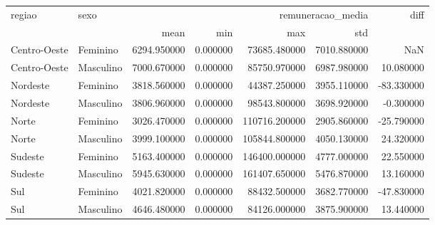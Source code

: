 \begin{tabular}{llrrrrr}
\toprule
regiao & sexo & \multicolumn{4}{r}{remuneracao_media} & diff \\
 &  & mean & min & max & std &  \\
\midrule
Centro-Oeste & Feminino & 6294.950000 & 0.000000 & 73685.480000 & 7010.880000 & NaN \\
Centro-Oeste & Masculino & 7000.670000 & 0.000000 & 85750.970000 & 6987.980000 & 10.080000 \\
Nordeste & Feminino & 3818.560000 & 0.000000 & 44387.250000 & 3955.110000 & -83.330000 \\
Nordeste & Masculino & 3806.960000 & 0.000000 & 98543.800000 & 3698.920000 & -0.300000 \\
Norte & Feminino & 3026.470000 & 0.000000 & 110716.200000 & 2905.860000 & -25.790000 \\
Norte & Masculino & 3999.100000 & 0.000000 & 105844.800000 & 4050.130000 & 24.320000 \\
Sudeste & Feminino & 5163.400000 & 0.000000 & 146400.000000 & 4777.000000 & 22.550000 \\
Sudeste & Masculino & 5945.630000 & 0.000000 & 161407.650000 & 5476.870000 & 13.160000 \\
Sul & Feminino & 4021.820000 & 0.000000 & 88432.500000 & 3682.770000 & -47.830000 \\
Sul & Masculino & 4646.480000 & 0.000000 & 84126.000000 & 3875.900000 & 13.440000 \\
\bottomrule
\end{tabular}
